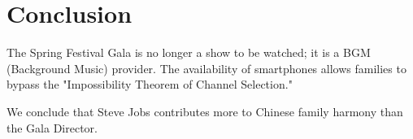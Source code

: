 \documentclass[AER]{AEA}
\DeclareRobustCommand{\AERlink}[1]{}
\begin{document}
\section{Conclusion}

The Spring Festival Gala is no longer a show to be watched; it is a BGM (Background Music) provider. The availability of smartphones allows families to bypass the "Impossibility Theorem of Channel Selection."

We conclude that Steve Jobs contributes more to Chinese family harmony than the Gala Director.

\FloatBarrier

\DeclareRobustCommand{\AERlink}[1]{\makebox[0pt][r]{\href{#1}{\color{blue}$\blacktriangleright$}\hspace{0.3em}}}

\nocite{*}


\end{document}
